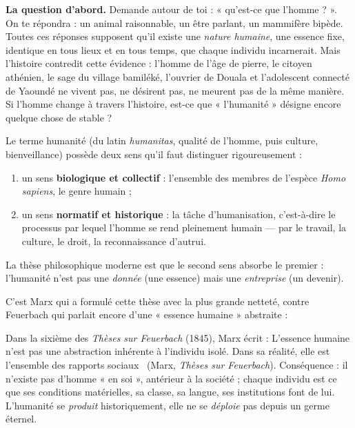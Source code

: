 \documentclass[11pt]{article}
\newcommand{\cle}[1]{{\popxbold\color{popdark}#1}}
\newcounter{popsec}
\newcounter{popsub}
\newcommand{\courssub}[1]{%
  \stepcounter{popsub}%
  \par\vspace{9pt}\noindent{\popxbold\fontsize{11.5}{13}\selectfont\color{popink}{\color{poporange}\thepopsec.\thepopsub}\hspace{6pt}#1}\par\nopagebreak\vspace{4pt}
}
\begin{document}
\courssub{L'humanité : d'une essence à une tâche}

\textbf{La question d'abord.} Demande autour de toi : « qu'est-ce que l'homme ? ». On te répondra : un animal raisonnable, un être parlant, un mammifère bipède. Toutes ces réponses supposent qu'il existe une \emph{nature humaine}, une essence fixe, identique en tous lieux et en tous temps, que chaque individu incarnerait. Mais l'histoire contredit cette évidence : l'homme de l'âge de pierre, le citoyen athénien, le sage du village bamiléké, l'ouvrier de Douala et l'adolescent connecté de Yaoundé ne vivent pas, ne désirent pas, ne meurent pas de la même manière. Si l'homme change à travers l'histoire, est-ce que « l'humanité » désigne encore quelque chose de stable ?

\begin{definition}[Humanité]
Le terme \cle{humanité} (du latin \emph{humanitas}, qualité de l'homme, puis culture, bienveillance) possède deux sens qu'il faut distinguer rigoureusement :
\begin{enumerate}
\item un sens \textbf{biologique et collectif} : l'ensemble des membres de l'espèce \emph{Homo sapiens}, le genre humain ;
\item un sens \textbf{normatif et historique} : la tâche d'humanisation, c'est-à-dire le processus par lequel l'homme se rend pleinement humain — par le travail, la culture, le droit, la reconnaissance d'autrui.
\end{enumerate}
La thèse philosophique moderne est que le second sens absorbe le premier : l'humanité n'est pas une \emph{donnée} (une essence) mais une \emph{entreprise} (un devenir).
\end{definition}

C'est Marx qui a formulé cette thèse avec la plus grande netteté, contre Feuerbach qui parlait encore d'une « essence humaine » abstraite :

\begin{propriete}
Dans la sixième des \emph{Thèses sur Feuerbach} (1845), Marx écrit : \guillemotleft L'essence humaine n'est pas une abstraction inhérente à l'individu isolé. Dans sa réalité, elle est l'ensemble des rapports sociaux \guillemotright\ (Marx, \emph{Thèses sur Feuerbach}). Conséquence : il n'existe pas d'homme « en soi », antérieur à la société ; chaque individu est ce que ses conditions matérielles, sa classe, sa langue, ses institutions font de lui. L'humanité se \emph{produit} historiquement, elle ne se \emph{déploie} pas depuis un germe éternel.
\end{propriete}
\end{document}
